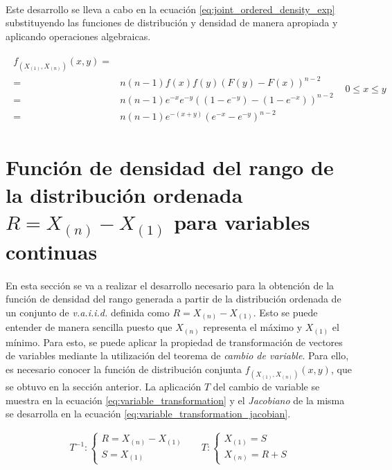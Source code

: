 \documentclass{article}
\begin{document}
      \paragraph{}
      Este desarrollo se lleva a cabo en la ecuación \eqref{eq:joint_ordered_density_exp} substituyendo las funciones de distribución y densidad de manera apropiada y aplicando operaciones algebraicas.

      \begin{align}
        \label{eq:joint_ordered_density_exp}
        \begin{split}
          f_{(X_{(1)}, X_{(n)})} (x,y) =& \\
          =& n(n-1)f(x)f(y)(F(y) - F(x))^{n-2} \\
          =& n  (n-1) e^{-x} e^{-y} ( (1 - e^{-y}) - (1 - e^{-x}) )^{n-2} \\
          =& n  (n-1) e^{-(x+y)} ( e^{-x} - e^{-y} )^{n-2}
        \end{split} & 0 \leq x \leq y
      \end{align}

  \section{Función de densidad del rango de la distribución ordenada $R = X_{(n)} - X_{(1)}$ para variables continuas}
  \label{sec:e2}

    \paragraph{}
    En esta sección se va a realizar el desarrollo necesario para la obtención de la función de densidad del rango generada a partir de la distribución ordenada de un conjunto de \emph{v.a.i.i.d.} definida como $R = X_{(n)} - X_{(1)}$. Esto se puede entender de manera sencilla puesto que $X_{(n)}$ representa el máximo y $X_{(1)}$ el mínimo. Para esto, se puede aplicar la propiedad de transformación de vectores de variables mediante la utilización del teorema de \emph{cambio de variable}. Para ello, es necesario conocer la función de distribución conjunta $f_{(X_{(1)}, X_{(n)})}(x,y)$, que se obtuvo en la sección anterior. La aplicación $T$ del cambio de variable se muestra en la ecuación \eqref{eq:variable_transformation} y el \emph{Jacobiano} de la misma se desarrolla en la ecuación \eqref{eq:variable_transformation_jacobian}.

    \begin{align}
    \label{eq:variable_transformation}
      T^{-1}:
      \begin{cases}
        R = X_{(n)} - X_{(1)} \\
        S = X_{(1)}
      \end{cases} &&
      T:
      \begin{cases}
        X_{(1)} = S \\
        X_{(n)} = R + S
      \end{cases}
    \end{align}
\end{document}
